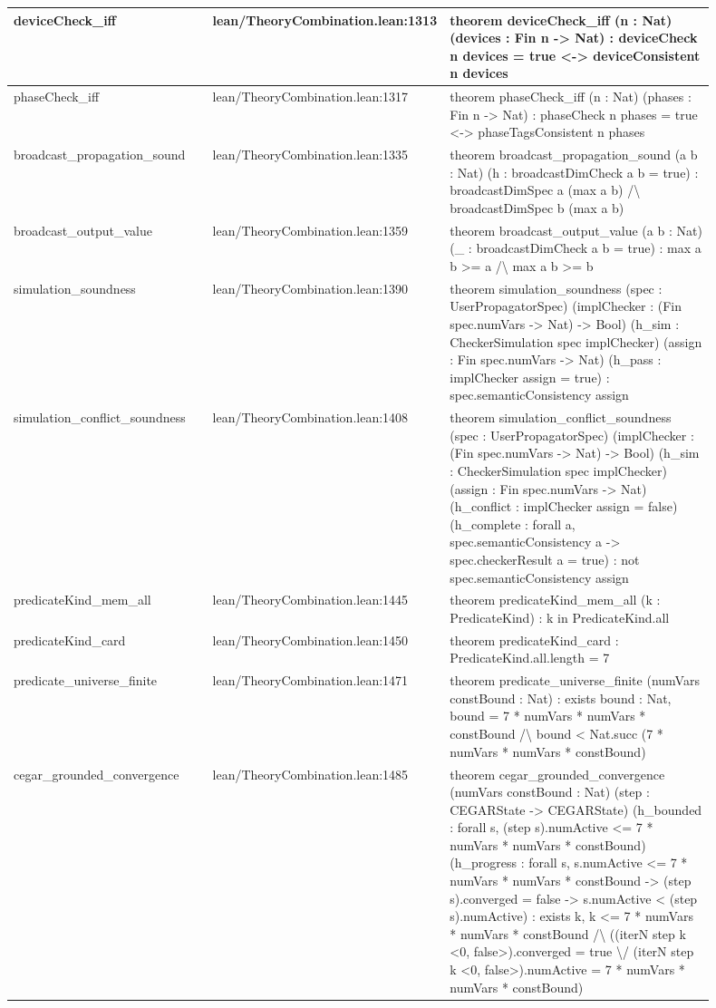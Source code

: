 \documentclass[10pt]{article}
\begin{document}
\begin{longtable}{|p{0.30\linewidth}|p{0.13\linewidth}|p{0.47\linewidth}|}
\hline
deviceCheck\_iff & lean/TheoryCombination.lean:1313 & theorem deviceCheck\_iff (n : Nat) (devices : Fin n -> Nat) : deviceCheck n devices = true <-> deviceConsistent n devices \\
\hline
phaseCheck\_iff & lean/TheoryCombination.lean:1317 & theorem phaseCheck\_iff (n : Nat) (phases : Fin n -> Nat) : phaseCheck n phases = true <-> phaseTagsConsistent n phases \\
\hline
broadcast\_propagation\_sound & lean/TheoryCombination.lean:1335 & theorem broadcast\_propagation\_sound (a b : Nat) (h : broadcastDimCheck a b = true) : broadcastDimSpec a (max a b) /\textbackslash{} broadcastDimSpec b (max a b) \\
\hline
broadcast\_output\_value & lean/TheoryCombination.lean:1359 & theorem broadcast\_output\_value (a b : Nat) (\_ : broadcastDimCheck a b = true) : max a b >= a /\textbackslash{} max a b >= b \\
\hline
simulation\_soundness & lean/TheoryCombination.lean:1390 & theorem simulation\_soundness (spec : UserPropagatorSpec) (implChecker : (Fin spec.numVars -> Nat) -> Bool) (h\_sim : CheckerSimulation spec implChecker) (assign : Fin spec.numVars -> Nat) (h\_pass : implChecker assign = true) : spec.semanticConsistency assign \\
\hline
simulation\_conflict\_soundness & lean/TheoryCombination.lean:1408 & theorem simulation\_conflict\_soundness (spec : UserPropagatorSpec) (implChecker : (Fin spec.numVars -> Nat) -> Bool) (h\_sim : CheckerSimulation spec implChecker) (assign : Fin spec.numVars -> Nat) (h\_conflict : implChecker assign = false) (h\_complete : forall a, spec.semanticConsistency a -> spec.checkerResult a = true) : not spec.semanticConsistency assign \\
\hline
predicateKind\_mem\_all & lean/TheoryCombination.lean:1445 & theorem predicateKind\_mem\_all (k : PredicateKind) : k in PredicateKind.all \\
\hline
predicateKind\_card & lean/TheoryCombination.lean:1450 & theorem predicateKind\_card : PredicateKind.all.length = 7 \\
\hline
predicate\_universe\_finite & lean/TheoryCombination.lean:1471 & theorem predicate\_universe\_finite (numVars constBound : Nat) : exists bound : Nat, bound = 7 * numVars * numVars * constBound /\textbackslash{} bound < Nat.succ (7 * numVars * numVars * constBound) \\
\hline
cegar\_grounded\_convergence & lean/TheoryCombination.lean:1485 & theorem cegar\_grounded\_convergence (numVars constBound : Nat) (step : CEGARState -> CEGARState) (h\_bounded : forall s, (step s).numActive <= 7 * numVars * numVars * constBound) (h\_progress : forall s, s.numActive <= 7 * numVars * numVars * constBound -> (step s).converged = false -> s.numActive < (step s).numActive) : exists k, k <= 7 * numVars * numVars * constBound /\textbackslash{} ((iterN step k <0, false>).converged = true \textbackslash{}/ (iterN step k <0, false>).numActive = 7 * numVars * numVars * constBound) \\

\end{longtable}
\end{document}
